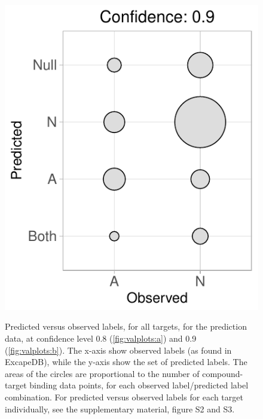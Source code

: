 \documentclass[10pt,article]{memoir}
\begin{document}
\begin{figure}[h!]
\begin{minipage}[c]{0.38\textwidth}
{        \includegraphics[width=1\textwidth]{figures/fig4b_alltargets_0p9_valplot.pdf}
    }\label{fig:valplots:b}
\end{minipage}
    \caption{Predicted versus observed labels, for all targets, for the
    prediction data, at confidence level 0.8 (\ref{fig:valplots:a}) and 0.9
    (\ref{fig:valplots:b}). The x-axis show observed labels (as found in
    ExcapeDB), while the y-axis show the set of predicted labels. The areas of
    the circles are proportional to the number of compound-target binding data
    points, for each observed label/predicted label combination.
    For predicted versus observed labels for each target individually, see
    the supplementary material, figure S2 and S3.}
    \label{fig:valplots}
\end{figure}
\end{document}
